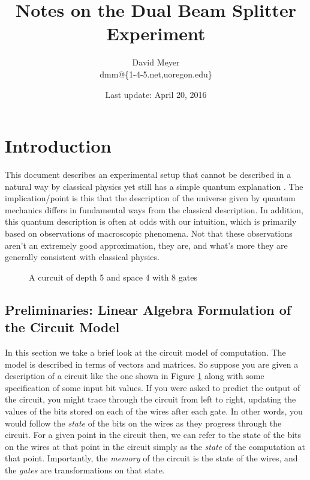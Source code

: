 \documentclass[11pt, oneside]{article}   	%
\title{Notes on the Dual Beam Splitter Experiment}
\author{David Meyer \\ dmm@\{1-4-5.net,uoregon.edu\}}
\date{Last update: April 20, 2016}							%
\begin{document}
\maketitle

\section{Introduction}
This document describes an experimental setup that cannot be described in a natural way by classical physics yet still  has a simple quantum explanation \cite{Aharonov:aa, Henault:2015aa}. The implication/point is this that the description of the universe given by quantum mechanics differs in fundamental ways from the classical description. In addition, this quantum description is often at odds with our intuition, which is primarily based on observations of macroscopic phenomena. Not that these observations aren't an extremely good approximation, they are, and what's more they are generally consistent with classical physics. 

\begin{figure}
\caption{A curcuit of depth 5 and space 4 with 8 gates}
\label{fig:circuit}
\end{figure}


\subsection{Preliminaries: Linear Algebra Formulation of the Circuit Model}

In this section we take a brief look at the circuit model of computation. The model is described in terms of vectors and matrices.  So suppose you are given a description of a circuit like the one shown in Figure \ref{fig:circuit} along with some specification of some input bit values. If you were asked to predict the output of the circuit,  you might trace through the circuit from left to right, updating the values of the bits stored on each of the wires after each gate. In other words, you would follow the \emph{state} of the bits on the wires as they progress through the circuit. For a given point in the circuit then, we can refer to the state of the bits on the wires at that point in the circuit simply as the \emph{state} of the computation at that point. Importantly, the \emph{memory} of the circuit is the state of the wires, and the \emph{gates} are transformations on that state. 
\end{document}
